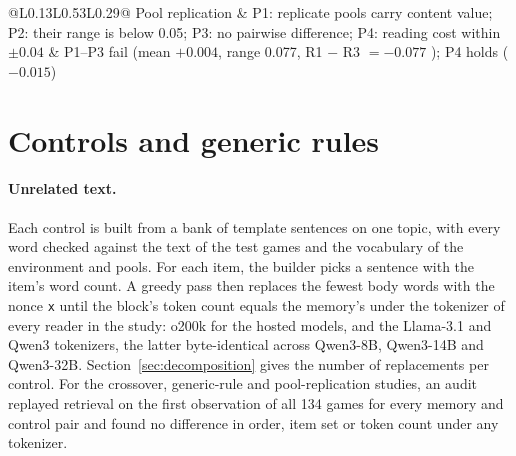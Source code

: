 \begin{table}[t]
\begin{tabular}{@{}L{0.13\textwidth}L{0.53\textwidth}L{0.29\textwidth}@{}}
Pool replication & P1: replicate pools carry content value; P2: their range is below 0.05; P3: no pairwise difference; P4: reading cost within $\pm0.04$ & P1--P3 fail (mean $+0.004$, range 0.077, R1 $-$ R3 $=-0.077$ ); P4 holds ($-0.015$) \\
\bottomrule
\end{tabular}
\caption{Predictions written down before the runs of the five studies and their outcomes. Exploratory
analyses in the paper are the WebShop action counts, the reading of GPT-4.1-mini's WebShop sessions, the
comparison of readers by success without memory, the split by difficulty and its interval, the interval
for the difference of spans, and the content value against the astronomy control. The five-reader gaps
between readers are protocol estimands without predictions and are not adjusted for multiplicity.}
\label{tab:protocols}
\end{table}

\section{Controls and generic rules}
\label{app:controls}

\paragraph{Unrelated text.} Each control is built from a bank of template sentences on one topic, with
every word checked against the text of the test games and the vocabulary of the environment and pools.
For each item, the builder picks a sentence with the item's word count. A greedy pass then replaces the
fewest body words with the nonce \texttt{x} until the block's token count equals the memory's under the
tokenizer of every reader in the study: o200k for the hosted models, and the Llama-3.1 and Qwen3
tokenizers, the latter byte-identical across Qwen3-8B, Qwen3-14B and Qwen3-32B. Section~\ref{sec:decomposition}
gives the number of replacements per control. For the crossover, generic-rule and pool-replication
studies, an audit replayed retrieval on the first observation of all 134 games for every memory and
control pair and found no difference in order, item set or token count under any tokenizer.

